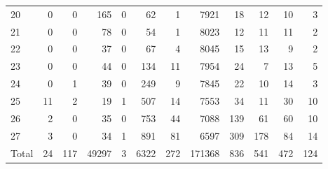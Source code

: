 \begin{table}
\begin{tabular}{lrrrrrrrrrrr}
20 & 0 & 0 & 165 & 0 & 62 & 1 & 7921 & 18 & 12 & 10 & 3 \\
21 & 0 & 0 & 78 & 0 & 54 & 1 & 8023 & 12 & 11 & 11 & 2 \\
22 & 0 & 0 & 37 & 0 & 67 & 4 & 8045 & 15 & 13 & 9 & 2 \\
23 & 0 & 0 & 44 & 0 & 134 & 11 & 7954 & 24 & 7 & 13 & 5 \\
24 & 0 & 1 & 39 & 0 & 249 & 9 & 7845 & 22 & 10 & 14 & 3 \\
25 & 11 & 2 & 19 & 1 & 507 & 14 & 7553 & 34 & 11 & 30 & 10 \\
26 & 2 & 0 & 35 & 0 & 753 & 44 & 7088 & 139 & 61 & 60 & 10 \\
27 & 3 & 0 & 34 & 1 & 891 & 81 & 6597 & 309 & 178 & 84 & 14 \\
Total & 24 & 117 & 49297 & 3 & 6322 & 272 & 171368 & 836 & 541 & 472 & 124 \\
\end{tabular}
\end{table}
